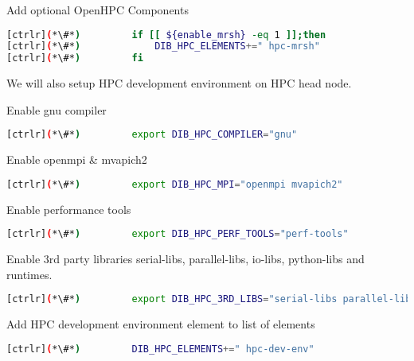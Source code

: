 	Add optional OpenHPC Components


\begin{lstlisting}[language=bash,keywords={}]
[ctrlr](*\#*)         if [[ ${enable_mrsh} -eq 1 ]];then
[ctrlr](*\#*)             DIB_HPC_ELEMENTS+=" hpc-mrsh"
[ctrlr](*\#*)         fi
\end{lstlisting} 

	We will also setup HPC development environment on HPC head node. 

	Enable gnu compiler


\begin{lstlisting}[language=bash,keywords={}]
[ctrlr](*\#*)         export DIB_HPC_COMPILER="gnu"
\end{lstlisting} 

	Enable openmpi \& mvapich2


\begin{lstlisting}[language=bash,keywords={}]
[ctrlr](*\#*)         export DIB_HPC_MPI="openmpi mvapich2"
\end{lstlisting} 

	Enable performance tools


\begin{lstlisting}[language=bash,keywords={}]
[ctrlr](*\#*)         export DIB_HPC_PERF_TOOLS="perf-tools"
\end{lstlisting} 

	Enable 3rd party libraries serial-libs, parallel-libs, io-libs, python-libs and runtimes.


\begin{lstlisting}[language=bash,keywords={}]
[ctrlr](*\#*)         export DIB_HPC_3RD_LIBS="serial-libs parallel-libs io-libs python-libs runtimes"
\end{lstlisting} 

	Add HPC development environment element to list of elements


\begin{lstlisting}[language=bash,keywords={}]
[ctrlr](*\#*)         DIB_HPC_ELEMENTS+=" hpc-dev-env"
\end{lstlisting} 

